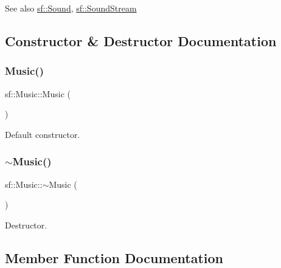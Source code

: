 \begin{DoxySeeAlso}{See also}
\mbox{\hyperlink{classsf_1_1_sound}{sf\+::\+Sound}}, \mbox{\hyperlink{classsf_1_1_sound_stream}{sf\+::\+Sound\+Stream}} \begin{DoxyVerb}\end{DoxyVerb}
 
\end{DoxySeeAlso}


\subsection{Constructor \& Destructor Documentation}
\mbox{\label{classsf_1_1_music_a0bc787d8e022b3a9b89cf2c28befd42e}} 
\subsubsection{\texorpdfstring{Music()}{Music()}}
{\footnotesize\ttfamily sf\+::\+Music\+::\+Music (\begin{DoxyParamCaption}{ }\end{DoxyParamCaption})}



Default constructor. 

\begin{DoxyVerb}\end{DoxyVerb}
 \mbox{\label{classsf_1_1_music_a4c65860fed2f01d0eaa6c4199870414b}} 
\subsubsection{\texorpdfstring{$\sim$Music()}{~Music()}}
{\footnotesize\ttfamily sf\+::\+Music\+::$\sim$\+Music (\begin{DoxyParamCaption}{ }\end{DoxyParamCaption})}



Destructor. 

\begin{DoxyVerb}\end{DoxyVerb}
 

\subsection{Member Function Documentation}
\mbox{\label{classsf_1_1_music_a288ef6f552a136b0e56952dcada3d672}} 
